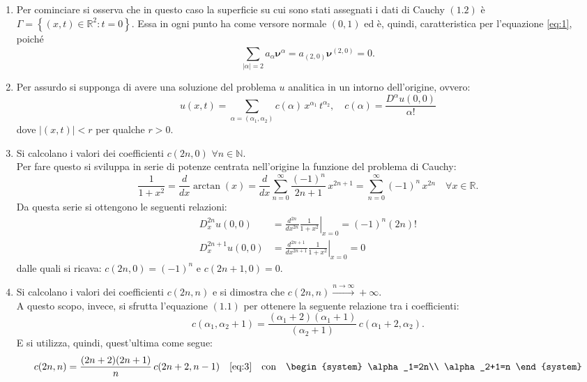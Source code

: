 \begin{example}
\begin{enumerate}
\item
Per cominciare si osserva che in questo caso la superficie su cui sono stati assegnati i dati di Cauchy $(1.2)$ è 
$\Gamma=\left\lbrace(x,t) \in \mathbb{R}^2:t=0\right\rbrace$. Essa in ogni punto ha come versore normale $(0,1)$ ed è, quindi,
caratteristica per l'equazione \eqref{eq:1}, poiché
$$\sum_{|\alpha|=2}^{\;} a_\alpha \boldsymbol{\nu}^\alpha = a_{(2,0)}\boldsymbol{\nu}^{(2,0)} = 0.$$
\item
Per assurdo si supponga di avere una soluzione del problema $u$ analitica in un intorno dell'origine, ovvero:
$$u(x,t) = \sum_{\alpha = (\alpha_1, \alpha_2) }^{\;} c(\alpha) \, x^{\alpha_1} \, t ^{\alpha_2}, \quad
 c(\alpha) = \frac{D^\alpha u(0,0)}{\alpha!}$$
dove $|(x,t)|<r$ per qualche $r>0$.
\item
Si calcolano i valori dei coefficienti $c(2n,0)$ $\forall n \in \mathbb{N}$.\\
Per fare questo si sviluppa in serie di potenze centrata nell'origine la funzione del problema di Cauchy:
$$\frac{1}{1+x^2} = \frac{d}{dx}\arctan(x) = \frac{d}{dx}\sum_{n=0}^{\infty}\frac{(-1)^n}{2n+1} \, x^{2n+1} 
= \sum_{n=0}^{\infty}(-1)^n \, x^{2n} \quad \forall x \in \mathbb{R}.$$
Da questa serie si ottengono le seguenti relazioni:
\begin{align*}
D_x^{2n}u(0,0) &= \frac{d^{2n}}{dx^{2n}} \left. \frac{1}{1+x^2}\right|_{x=0} = (-1)^n (2n)!\\
D_x^{2n+1}u(0,0) &= \frac{d^{2n+1}}{dx^{2n+1}} \left. \frac{1}{1+x^2} \right|_{x=0} = 0
\end{align*} 
dalle quali si ricava: $c(2n,0)=(-1)^n$ e $c(2n+1,0)=0$.
\item
Si calcolano i valori dei coefficienti $c(2n,n)$ e si dimostra che  $c(2n,n) \xrightarrow{n\rightarrow\infty} +\infty$.\\
A questo scopo, invece, si sfrutta l'equazione $(1.1)$ per ottenere la seguente relazione tra i coefficienti:
\begin{equation} 
\label{eq:3}
c(\alpha_1,\alpha_2+1) = \frac{(\alpha_1+2)(\alpha_1+1)}{(\alpha_2+1)} \, c(\alpha_1+2,\alpha_2).
\end{equation}
E si utilizza, quindi, quest'ultima come segue:
\begin{align*}
c(2n,n) &= \frac{(2n+2)(2n+1)}{n} \, c(2n+2,n-1)   &\eqref{eq:3}\quad\text{con} \quad 
\begin{system}
\alpha_1=2n\\
\alpha_2+1=n
\end{system}\\

\end{align*}
\end{enumerate}
\end{example}
